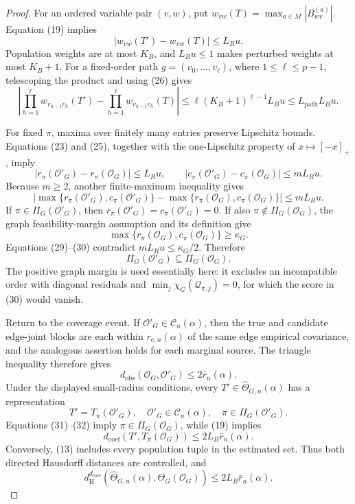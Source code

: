 \documentclass{article}
\begin{document}
\begin{proof}
For an ordered variable pair \((v,w)\), put \(w_{vw}(T)=\max_{a\in M}|B_{wv}^{(a)}|\).  Equation (19) implies
\[
|w_{vw}(T')-w_{vw}(T)|\le L_Bu.
\tag{26}
\]
Population weights are at most \(K_B\), and \(L_Bu\le1\) makes perturbed weights at most \(K_B+1\).  For a fixed-order path \(g=(v_0,\ldots,v_\ell)\), where \(1\le\ell\le p-1\), telescoping the product and using (26) gives
\[
\left|\prod_{h=1}^{\ell}w_{v_{h-1}v_h}(T')-
\prod_{h=1}^{\ell}w_{v_{h-1}v_h}(T)\right|
\le\ell(K_B+1)^{\ell-1}L_Bu
\le L_{\mathrm{path}}L_Bu.
\tag{27}
\]

For fixed \(\pi\), maxima over finitely many entries preserve Lipschitz bounds.  Equations (23) and (25), together with the one-Lipschitz property of \(x\mapsto[-x]_+\), imply
\[
|r_\pi(\mathcal O'_G)-r_\pi(\mathcal O_G)|\le L_Ru,
\qquad
|c_\pi(\mathcal O'_G)-c_\pi(\mathcal O_G)|\le mL_Ru.
\tag{28}
\]
Because \(m\ge2\), another finite-maximum inequality gives
\[
\left|\max\{r_\pi(\mathcal O'_G),c_\pi(\mathcal O'_G)\}
-\max\{r_\pi(\mathcal O_G),c_\pi(\mathcal O_G)\}\right|
\le mL_Ru.
\tag{29}
\]
If \(\pi\in\Pi_G(\mathcal O'_G)\), then \(r_\pi(\mathcal O'_G)=c_\pi(\mathcal O'_G)=0\).  If also \(\pi\notin\Pi_G(\mathcal O_G)\), the graph feasibility-margin assumption and its definition give
\[
\max\{r_\pi(\mathcal O_G),c_\pi(\mathcal O_G)\}\ge\kappa_G.
\tag{30}
\]
Equations (29)--(30) contradict \(mL_Ru\le\kappa_G/2\).  Therefore
\[
\Pi_G(\mathcal O'_G)\subseteq\Pi_G(\mathcal O_G).
\tag{31}
\]
The positive graph margin is used essentially here: it excludes an incompatible order with diagonal residuals and \(\min_j\chi_G(\mathcal Q_{\pi,j})=0\), for which the score in (30) would vanish.

Return to the coverage event.  If \(\mathcal O'_G\in\mathcal C_n(\alpha)\), then the true and candidate edge-joint blocks are each within \(r_{e,n}(\alpha)\) of the same edge empirical covariance, and the analogous assertion holds for each marginal source.  The triangle inequality therefore gives
\[
d_{\mathrm{obs}}(\mathcal O_G,\mathcal O'_G)
\le2\bar r_n(\alpha).
\tag{32}
\]
Under the displayed small-radius conditions, every \(T'\in\widehat\Theta_{G,n}(\alpha)\) has a representation
\[
T'=T_\pi(\mathcal O'_G),
\quad
\mathcal O'_G\in\mathcal C_n(\alpha),
\quad
\pi\in\Pi_G(\mathcal O'_G).
\tag{33}
\]
Equations (31)--(32) imply \(\pi\in\Pi_G(\mathcal O_G)\), while (19) implies
\[
d_{\mathrm{coef}}(T',T_\pi(\mathcal O_G))
\le2L_B\bar r_n(\alpha).
\tag{34}
\]
Conversely, (13) includes every population tuple in the estimated set.  Thus both directed Hausdorff distances are controlled, and
\[
d_{\mathrm H}^{d_{\mathrm{coef}}}
(\widehat\Theta_{G,n}(\alpha),\Theta_G(\mathcal O_G))
\le2L_B\bar r_n(\alpha).
\tag{35}
\]


\end{proof}
\end{document}
